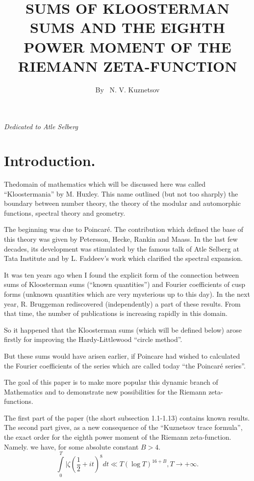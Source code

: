 
\title{SUMS OF KLOOSTERMAN SUMS AND THE EIGHTH POWER MOMENT OF THE RIEMANN ZETA-FUNCTION}

\author{By~ N. V. Kuznetsov}

\date{}
\maketitle

\setcounter{page}{63} 
\setcounter{pageoriginal}{56} 

\hfill \textit{Dedicated to Atle Selberg}

\setcounter{section}{-1}
\section{Introduction.} The\pageoriginale domain of mathematics which will be discussed here was called ``Kloostermania'' by M. Huxley. This name outlined (but not too sharply) the boundary between number theory, the theory of the modular and automorphic functions, spectral theory and geometry.

The beginning was due to Poincar\'e. The contribution which defined the base of this theory was given by Petersson, Hecke, Rankin and Maass. In the last few decades, its development was stimulated by the famous talk of Atle Selberg at Tata Institute and by  L. Faddeev's work which clarified the spectral expansion.

It was ten years ago when I found the explicit form of the connection between sums of Kloosterman sums (``known quantities'') and Fourier coefficients of cusp forms (unknown quantities which are very mysterious up to this day). In the next year, R. Bruggeman rediscovered (independently) a part of these results. From that time, the number of publications is increasing rapidly in this domain. 

So it happened that the Kloosterman sums (which will be defined below) arose firstly for improving the Hardy-Littlewood ``circle method''. 

But these sums would have arisen earlier, if Poincare had wished to calculated the Fourier coefficients of the series which are called today ``the Poincar\'e series''.

The goal of this paper is to make more popular this dynamic branch of Mathematics and to demonstrate new possibilities for the Riemann zeta-functions.

The first part of the paper (the short subsection 1.1-1.13) contains known results. The second part gives, as a new consequence of the ``Kuznetsov trace formula'', the exact order for the eighth power moment of the Riemann zeta-function. Namely. we have, for some absolute constant $B > 4$.
$$
\int\limits^T_0 |\zeta (\frac{1}{2} + it)^8 dt \ll T (\log T)^{16+B} , T \to + \infty.
$$

